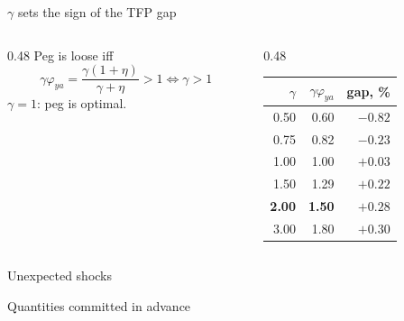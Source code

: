 \documentclass[aspectratio=169,11pt]{beamer}
\newcommand{\hl}[1]{{\color{mblue}\textbf{#1}}}
\begin{document}
\begin{frame}{$\gamma$ sets the sign of the TFP gap}
  \begin{columns}[c,onlytextwidth]
    \begin{column}{0.48\textwidth}
      Peg is loose iff
      \[
        \gamma\varphi_{ya}=\frac{\gamma(1+\eta)}{\gamma+\eta}>1\iff\gamma>1
      \]
      $\gamma=1$: peg is optimal.
    \end{column}
    \begin{column}{0.48\textwidth}
      \centering
      \begin{tabular}{rrr}
        \toprule
        $\gamma$ & $\gamma\varphi_{ya}$ & gap, \%\\
        \midrule
        0.50 & 0.60 & $-0.82$\\
        0.75 & 0.82 & $-0.23$\\
        1.00 & 1.00 & $+0.03$\\
        1.50 & 1.29 & $+0.22$\\
        \hl{2.00} & \hl{1.50} & \hl{$+0.28$}\\
        3.00 & 1.80 & $+0.30$\\
        \bottomrule
      \end{tabular}
    \end{column}
  \end{columns}
\end{frame}

\begin{frame}[plain]
  \vfill
  {\color{ink}Unexpected shocks\par}
  \smallskip
  {\Large\color{mblue}Quantities committed in advance\par}
  \vfill
\end{frame}
\end{document}
